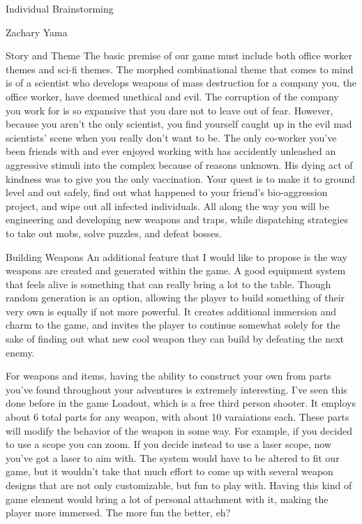 \documentclass[12pt]{report}
\begin{document}
\begin{section}{Individual Brainstorming}
\begin{subsection}{Zachary Yama}
\begin{subsubsection}{Story and Theme}
The basic premise of our game must include both office worker themes and
sci-fi themes. The morphed combinational theme that comes to mind is of a
scientist who develops weapons of mass destruction for a company you, the
office worker, have deemed unethical and evil. The corruption of the company
you work for is so expansive that you dare not to leave out of fear.
However, because you aren’t the only scientist, you find yourself caught up
in the evil mad scientists’ scene when you really don’t want to be. The only
co-worker you’ve been friends with and ever enjoyed working with has
accidently unleashed an aggressive stimuli into the complex because of
reasons unknown. His dying act of kindness was to give you the only
vaccination. Your quest is to make it to ground level and out safely,
find out what
happened to your friend’s bio-aggression project, and wipe out all infected
individuals. All along the way you will be engineering and developing new
weapons and traps, while dispatching strategies to take out mobs, solve puzzles,
and defeat bosses.
\end{subsubsection}

\begin{subsubsection}{Building Weapons}
An additional feature that I would like to propose is the way weapons are
created and generated within the game. A good equipment system that feels
alive is something that can really bring a lot to the table. Though random
generation is an option, allowing the player to build something of their
very own is equally if not more powerful. It creates additional immersion
and charm to the game, and invites the player to continue somewhat solely for
the sake of finding out what new cool weapon they can build by defeating
the next enemy.

For weapons and items, having the ability to construct your own from parts
you've found throughout your adventures is extremely interesting. I've
seen this done before in the game Loadout, which is a free third person
shooter. It employs about 6 total parts for any weapon, with about
10 varaiations each. These parts will modify the behavior of the weapon in
some way. For example, if you decided to use a scope you can zoom. If you
decide instead to use a laser scope, now you've got a laser to aim with. The
system would have to be altered to fit our game, but it wouldn't take that
much effort to come up with several weapon designs that are not only
customizable, but fun to play with. Having this kind of game element would
bring a lot of personal attachment with it, making the player more immersed.
The more fun the better, eh?
\end{subsubsection}
\end{subsection}
\end{section}
\end{document}

